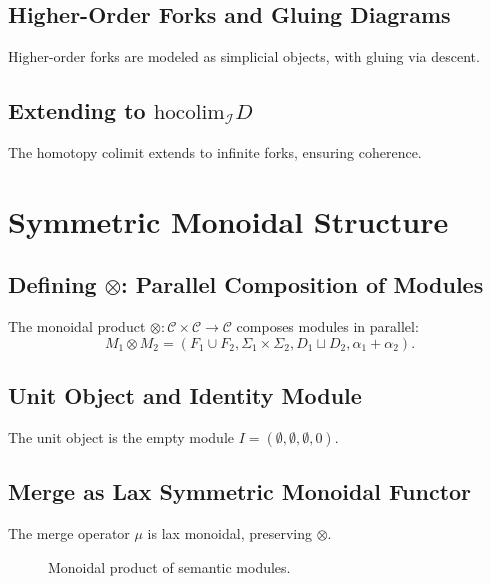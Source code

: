 \documentclass[12pt]{article}
\begin{document}
\subsection{Higher-Order Forks and Gluing Diagrams}
Higher-order forks are modeled as simplicial objects, with gluing via descent.

\subsection{Extending to $\mathrm{hocolim}_\mathcal{I} D$}
The homotopy colimit extends to infinite forks, ensuring coherence.

\section{Symmetric Monoidal Structure}
\subsection{Defining $\otimes$: Parallel Composition of Modules}
The monoidal product $\otimes: \mathcal{C} \times \mathcal{C} \to \mathcal{C}$ composes modules in parallel:
\[
M_1 \otimes M_2 = (F_1 \cup F_2, \Sigma_1 \times \Sigma_2, D_1 \sqcup D_2, \alpha_1 + \alpha_2).
\]

\subsection{Unit Object and Identity Module}
The unit object is the empty module $I = (\emptyset, \emptyset, \emptyset, 0)$.

\subsection{Merge as Lax Symmetric Monoidal Functor}
The merge operator $\mu$ is lax monoidal, preserving $\otimes$.

\begin{figure}[h]
    \centering
    \caption{Monoidal product of semantic modules.}
\end{figure}
\end{document}
